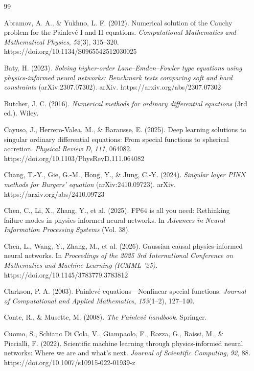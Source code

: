 \documentclass[a4paper, 10pt]{article}
\theoremstyle{definition}
\begin{document}
\begin{thebibliography}{99}

Abramov, A. A., \& Yukhno, L. F. (2012). Numerical solution of the Cauchy problem for the Painlev\'e I and II equations. \emph{Computational Mathematics and Mathematical Physics}, \emph{52}(3), 315--320. https://doi.org/10.1134/S0965542512030025

Baty, H. (2023). \emph{Solving higher-order {Lane--Emden--Fowler} type equations using physics-informed neural networks: Benchmark tests comparing soft and hard constraints} (arXiv:2307.07302). arXiv. https://arxiv.org/abs/2307.07302

Butcher, J. C. (2016). \emph{Numerical methods for ordinary differential equations} (3rd ed.). Wiley.

Cayuso, J., Herrero-Valea, M., \& Barausse, E. (2025). Deep learning solutions to singular ordinary differential equations: From special functions to spherical accretion. \emph{Physical Review D}, \emph{111}, 064082. https://doi.org/10.1103/PhysRevD.111.064082

Chang, T.-Y., Gie, G.-M., Hong, Y., \& Jung, C.-Y. (2024). \emph{Singular layer {PINN} methods for {Burgers}' equation} (arXiv:2410.09723). arXiv. https://arxiv.org/abs/2410.09723

Chen, C., Li, X., Zhang, Y., et al. (2025). {FP64} is all you need: Rethinking failure modes in physics-informed neural networks. In \emph{Advances in Neural Information Processing Systems} (Vol. 38).

Chen, L., Wang, Y., Zhang, M., et al. (2026). Gaussian causal physics-informed neural networks. In \emph{Proceedings of the 2025 3rd International Conference on Mathematics and Machine Learning (ICMML '25)}. https://doi.org/10.1145/3783779.3783812

Clarkson, P. A. (2003). {Painlev\'e} equations---Nonlinear special functions. \emph{Journal of Computational and Applied Mathematics}, \emph{153}(1--2), 127--140.

Conte, R., \& Musette, M. (2008). \emph{The {Painlev\'e} handbook}. Springer.

Cuomo, S., Schiano Di Cola, V., Giampaolo, F., Rozza, G., Raissi, M., \& Piccialli, F. (2022). Scientific machine learning through physics-informed neural networks: Where we are and what's next. \emph{Journal of Scientific Computing}, \emph{92}, 88. https://doi.org/10.1007/s10915-022-01939-z


\end{thebibliography}
\end{document}
